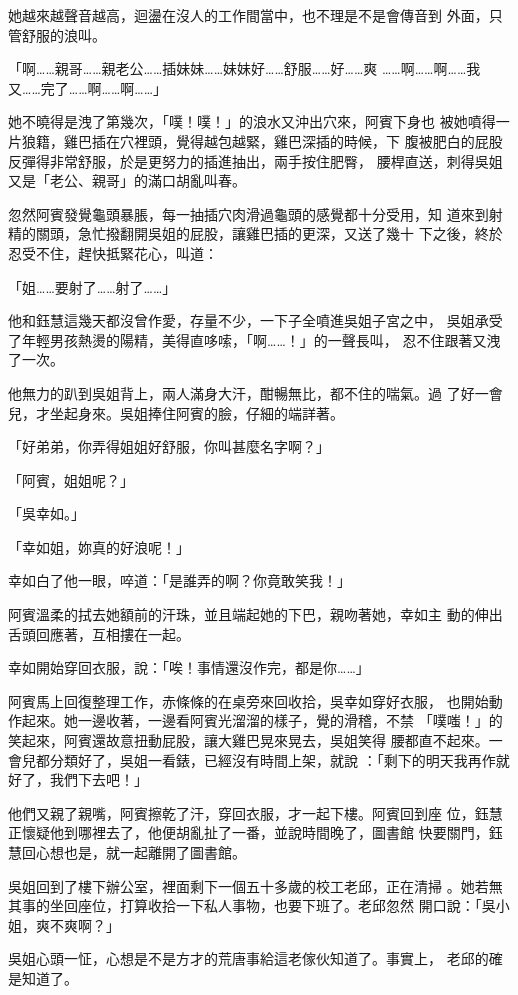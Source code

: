 她越來越聲音越高，迴盪在沒人的工作間當中，也不理是不是會傳音到
外面，只管舒服的浪叫。

「啊……親哥……親老公……插妹妹……妹妹好……舒服……好……爽
……啊……啊……我又……完了……啊……啊……」

她不曉得是洩了第幾次，「噗！噗！」的浪水又沖出穴來，阿賓下身也
被她噴得一片狼籍，雞巴插在穴裡頭，覺得越包越緊，雞巴深插的時候，下
腹被肥白的屁股反彈得非常舒服，於是更努力的插進抽出，兩手按住肥臀，
腰桿直送，刺得吳姐又是「老公、親哥」的滿口胡亂叫春。

忽然阿賓發覺龜頭暴脹，每一抽插穴肉滑過龜頭的感覺都十分受用，知
道來到射精的關頭，急忙撥翻開吳姐的屁股，讓雞巴插的更深，又送了幾十
下之後，終於忍受不住，趕快抵緊花心，叫道：

「姐……要射了……射了……」

他和鈺慧這幾天都沒曾作愛，存量不少，一下子全噴進吳姐子宮之中，
吳姐承受了年輕男孩熱燙的陽精，美得直哆嗦，「啊……！」的一聲長叫，
忍不住跟著又洩了一次。

他無力的趴到吳姐背上，兩人滿身大汗，酣暢無比，都不住的喘氣。過
了好一會兒，才坐起身來。吳姐捧住阿賓的臉，仔細的端詳著。

「好弟弟，你弄得姐姐好舒服，你叫甚麼名字啊？」

「阿賓，姐姐呢？」

「吳幸如。」

「幸如姐，妳真的好浪呢！」

幸如白了他一眼，啐道：「是誰弄的啊？你竟敢笑我！」

阿賓溫柔的拭去她額前的汗珠，並且端起她的下巴，親吻著她，幸如主
動的伸出舌頭回應著，互相摟在一起。

幸如開始穿回衣服，說：「唉！事情還沒作完，都是你……」

阿賓馬上回復整理工作，赤條條的在桌旁來回收拾，吳幸如穿好衣服，
也開始動作起來。她一邊收著，一邊看阿賓光溜溜的樣子，覺的滑稽，不禁
「噗嗤！」的笑起來，阿賓還故意扭動屁股，讓大雞巴晃來晃去，吳姐笑得
腰都直不起來。一會兒都分類好了，吳姐一看錶，已經沒有時間上架，就說
：「剩下的明天我再作就好了，我們下去吧！」

他們又親了親嘴，阿賓擦乾了汗，穿回衣服，才一起下樓。阿賓回到座
位，鈺慧正懷疑他到哪裡去了，他便胡亂扯了一番，並說時間晚了，圖書館
快要關門，鈺慧回心想也是，就一起離開了圖書館。

吳姐回到了樓下辦公室，裡面剩下一個五十多歲的校工老邱，正在清掃
。她若無其事的坐回座位，打算收拾一下私人事物，也要下班了。老邱忽然
開口說：「吳小姐，爽不爽啊？」

吳姐心頭一怔，心想是不是方才的荒唐事給這老傢伙知道了。事實上，
老邱的確是知道了。

